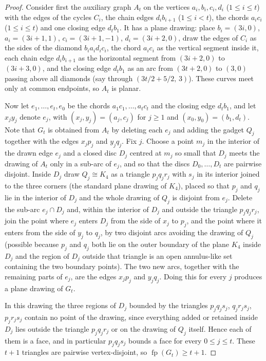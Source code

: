 \documentclass[11pt,a4paper]{article}
\theoremstyle{plain}
\theoremstyle{definition}
\theoremstyle{remark}
\newcommand{\fp}{\operatorname{fp}}
\newcommand{\Gtt}{G_t}
\begin{document}
\label{pf:planar}
\lemplanar*
\begin{proof}
Consider first the auxiliary graph $A_t$ on the vertices $a_i,b_i,c_i,d_i$ ($1\le i\le t$) with the edges of the cycles $C_i$, the chain edges $d_ib_{i+1}$ ($1\le i<t$), the chords $a_ic_i$ ($1\le i\le t$) and one closing edge $d_tb_1$. It has a plane drawing: place $b_i=(3i,0)$, $a_i=(3i+1,1)$, $c_i=(3i+1,-1)$, $d_i=(3i+2,0)$, draw the edges of $C_i$ as the sides of the diamond $b_ia_id_ic_i$, the chord $a_ic_i$ as the vertical segment inside it, each chain edge $d_ib_{i+1}$ as the horizontal segment from $(3i+2,0)$ to $(3i+3,0)$, and the closing edge $d_tb_1$ as an arc from $(3t+2,0)$ to $(3,0)$ passing above all diamonds (say through $(3t/2+5/2,\,3)$). These curves meet only at common endpoints, so $A_t$ is planar.

Now let $e_1,\dots,e_t,e_0$ be the chords $a_1c_1,\dots,a_tc_t$ and the closing edge $d_tb_1$, and let $x_jy_j$ denote $e_j$, with $(x_j,y_j)=(a_j,c_j)$ for $j\ge1$ and $(x_0,y_0)=(b_1,d_t)$. Note that $\Gtt$ is obtained from $A_t$ by deleting each $e_j$ and adding the gadget $Q_j$ together with the edges $x_jp_j$ and $y_jq_j$. Fix $j$. Choose a point $m_j$ in the interior of the drawn edge $e_j$ and a closed disc $D_j$ centred at $m_j$ so small that $D_j$ meets the drawing of $A_t$ only in a sub-arc of $e_j$, and so that the discs $D_0,\dots,D_t$ are pairwise disjoint. Inside $D_j$ draw $Q_j\cong K_4$ as a triangle $p_jq_jr_j$ with $s_j$ in its interior joined to the three corners (the standard plane drawing of $K_4$), placed so that $p_j$ and $q_j$ lie in the interior of $D_j$ and the whole drawing of $Q_j$ is disjoint from $e_j$. Delete the sub-arc $e_j\cap D_j$ and, within the interior of $D_j$ and outside the triangle $p_jq_jr_j$, join the point where $e_j$ enters $D_j$ from the side of $x_j$ to $p_j$, and the point where it enters from the side of $y_j$ to $q_j$, by two disjoint arcs avoiding the drawing of $Q_j$ (possible because $p_j$ and $q_j$ both lie on the outer boundary of the plane $K_4$ inside $D_j$ and the region of $D_j$ outside that triangle is an open annulus-like set containing the two boundary points). The two new arcs, together with the remaining parts of $e_j$, are the edges $x_jp_j$ and $y_jq_j$. Doing this for every $j$ produces a plane drawing of $\Gtt$.

In this drawing the three regions of $D_j$ bounded by the triangles $p_jq_js_j$, $q_jr_js_j$, $p_jr_js_j$ contain no point of the drawing, since everything added or retained inside $D_j$ lies outside the triangle $p_jq_jr_j$ or on the drawing of $Q_j$ itself. Hence each of them is a face, and in particular $p_jq_js_j$ bounds a face for every $0\le j\le t$. These $t+1$ triangles are pairwise vertex-disjoint, so $\fp(\Gtt)\ge t+1$.
\end{proof}
\end{document}
